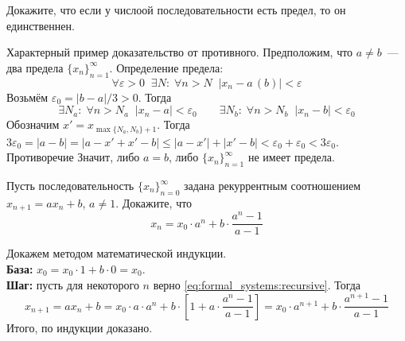 \begin{Exercise}[counter=SecExercise]
    \noindent
    Докажите, что если у числоой последовательности есть предел, то он единственнен.
\end{Exercise}

\begin{Answer}
    \noindent
    Характерный пример доказательство от противного.
    Предположим, что $ a \neq b $~--- два предела $ \{ x_n \}_{n=1}^{\infty} $.
    Определение предела:
    \[
        \forall \varepsilon > 0 \;\; \exists N: \; \forall n > N \;\; |x_n - a\,(b)| < \varepsilon
    \]
    Возьмём $ \varepsilon_0 = |b - a| / 3 > 0 $.
    Тогда
    \[
        \exists N_a: \; \forall n > N_a \;\; |x_n - a| < \varepsilon_0 \qquad
        \exists N_b: \; \forall n > N_b \;\; |x_n - b| < \varepsilon_0
    \]
    Обозначим $ x' = x_{\max \{N_a, N_b\} + 1} $.
    Тогда $ 3\varepsilon_0 = |a - b| = |a - x' + x' - b| \leqslant |a - x'| + |x' - b| < \varepsilon_0 + \varepsilon_0 <  3 \varepsilon_0 $.
    Противоречие
    Значит, либо $ a = b $, либо $ \{x_n\}_{n=1}^{\infty} $ не имеет предела.
\end{Answer}


\begin{Exercise}[counter=SecExercise]
    \noindent
    Пусть последовательность $ \{ x_n \}_{n=0}^{\infty} $ задана рекуррентным соотношением $ x_{n+1} = a x_n + b $, $ a \neq 1 $.
    Докажите, что
    \begin{equation}
        \label{eq:formal_systems:recursive}
        x_n = x_0 \cdot a^n + b \cdot \frac{a^n - 1}{a - 1}
    \end{equation}
\end{Exercise}

\begin{Answer}
    \noindent
    Докажем методом математической индукции.\\
    \textbf{База:} $ x_0 = x_0 \cdot 1 + b \cdot 0 = x_0 $.\\
    \textbf{Шаг:} пусть для некоторого $ n $ верно \eqref{eq:formal_systems:recursive}.
    Тогда
    \[
        x_{n+1} = a x_n + b = x_0 \cdot a \cdot a^n + b \cdot \left[ 1 + a \cdot \frac{a^n - 1}{a - 1} \right] = x_0 \cdot a^{n+1} + b \cdot \frac{a^{n+1} - 1}{a - 1}
    \]
    Итого, по индукции доказано.
\end{Answer}
